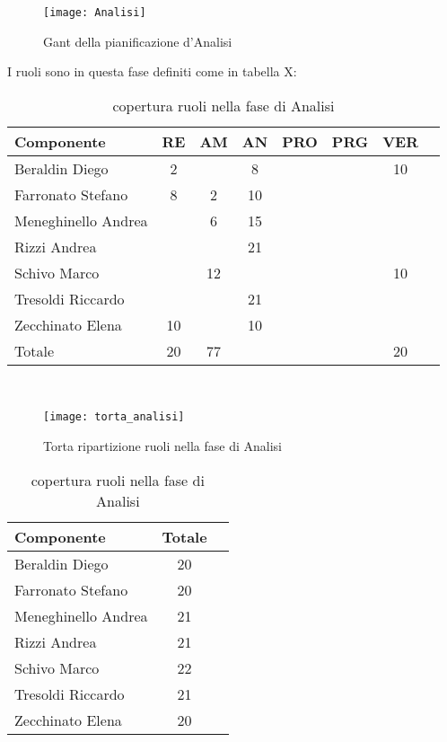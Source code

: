 \begin{figure}[h]
  \texttt{[image: Analisi]}
\caption{Gant della pianificazione d'Analisi }
\end{figure}

I ruoli sono in questa fase definiti come in tabella X:\\
\begin{table}[h]
\centering
\begin{tabular}{|l|c|c|c|c|c|cl|}
\hline
Componente& RE& AM& AN& PRO& PRG& VER& \\
\hline
Beraldin Diego & 2& & 8& & & 10&\\
Farronato Stefano & 8& 2& 10& & & &\\
Meneghinello Andrea & & 6& 15& & & &\\
Rizzi Andrea & & & 21& & & &\\
Schivo Marco & & 12& & & & 10&\\
Tresoldi Riccardo & & & 21& & & &\\
Zecchinato Elena & 10& & 10& & & &\\
\hline
Totale & 20& 77& & & & 20&\\
\hline
\end{tabular}
\caption{copertura ruoli nella fase di Analisi}
\end{table}\\

\begin{figure}[h]
  \texttt{[image: torta\_analisi]}
\caption{Torta ripartizione ruoli nella fase di Analisi}
\end{figure}

\begin{table}[h]
\centering
\begin{tabular}{|l|cl|}
\hline
Componente& Totale& \\
\hline
Beraldin Diego & 20&\\
Farronato Stefano & 20&\\
Meneghinello Andrea & 21&\\
Rizzi Andrea &  21&\\
Schivo Marco & 22&\\
Tresoldi Riccardo & 21&\\
Zecchinato Elena & 20&\\
\hline
\end{tabular}
\caption{copertura ruoli nella fase di Analisi}
\end{table}

